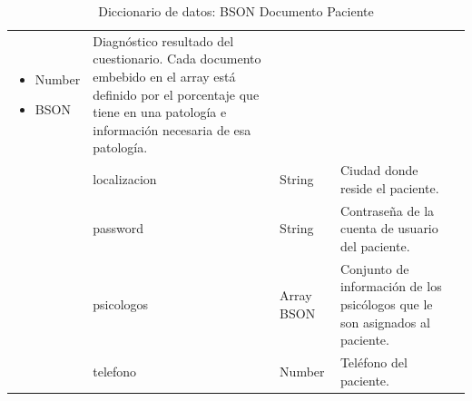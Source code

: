\begin{table}[htpb]
\begin{tabularx}{\textwidth}{|l|X|X|X|X|}
\begin{itemize}
             \item Number
             \item BSON                     
\end{itemize}   & Diagnóstico resultado del cuestionario. Cada documento embebido en el array está definido por el porcentaje que tiene en una patología e información necesaria de esa patología. \\ \cline{2-4} 
                                    & localizacion                         & String                     & Ciudad donde reside el paciente.                                                                                                                                                 \\ \cline{2-4} 
                                    & password                             & String                     & Contraseña de la cuenta de usuario del paciente.                                                                                                                                 \\ \cline{2-4} 
                                    & psicologos                           & Array BSON                 & Conjunto de información de los psicólogos que le son asignados al paciente.                                                                                                      \\ \cline{2-4} 
                                    & telefono                             & Number                     & Teléfono del paciente.                                                                                                                                                           \\ \hline
\end{tabularx}
\caption{Diccionario de datos: BSON Documento Paciente}
\label{fig:dic_datos_BSON_2}
\end{table}

